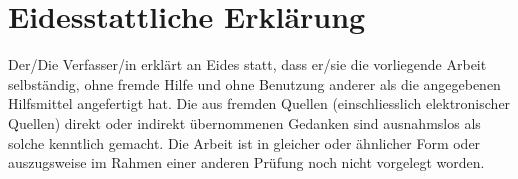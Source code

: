 \documentclass[11pt,a4paper,english,oneside]{book}
\begin{document}
\printbibliography
\newpage
\thispagestyle{firststyle}
\section*{Eidesstattliche Erklärung}
Der/Die Verfasser/in erklärt an Eides statt, dass er/sie die vorliegende Arbeit selbständig, ohne fremde Hilfe und ohne Benutzung anderer als die angegebenen Hilfsmittel angefertigt hat. Die aus fremden Quellen (einschliesslich elektronischer Quellen) direkt oder indirekt übernommenen Gedanken sind ausnahmslos als solche kenntlich gemacht. Die Arbeit ist in gleicher oder ähnlicher Form oder auszugsweise im Rahmen einer anderen Prüfung noch nicht vorgelegt worden.\\[2cm]
 \hfill {}
\end{document}

